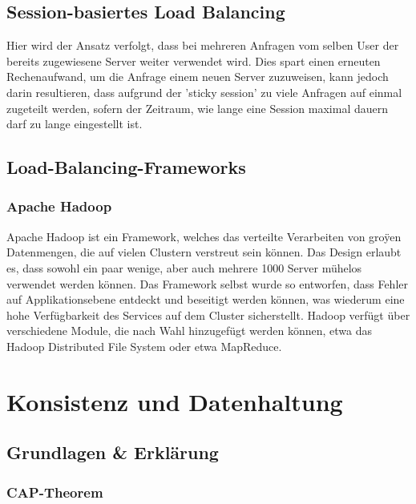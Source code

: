 \documentclass[letterpaper, 12pt]{article}
\let\tempsection\section
\renewcommand\section[1]{\vspace{-0.3cm}\tempsection{#1}\vspace{-0.3cm}}
\let\tempsubsection\subsection
\renewcommand\subsection[1]{\vspace{0cm}\tempsubsection{#1}\vspace{0cm}}
\let\tempsubsubsection\subsubsection
\renewcommand\subsubsection[1]{\vspace{0cm}\tempsubsubsection{#1}\vspace{0cm}}
\begin{document}
\subsection{Session-basiertes Load Balancing}

Hier wird der Ansatz verfolgt, dass bei mehreren Anfragen vom selben User der bereits zugewiesene Server weiter verwendet wird. Dies spart einen erneuten Rechenaufwand, um die Anfrage einem neuen Server zuzuweisen, kann jedoch darin resultieren, dass aufgrund der 'sticky session' zu viele Anfragen auf einmal zugeteilt werden, sofern der Zeitraum, wie lange eine Session maximal dauern darf zu lange eingestellt ist. \cite{ausarbeitunglb}

\subsection{Load-Balancing-Frameworks}

\subsubsection{Apache Hadoop}

Apache Hadoop ist ein Framework, welches das verteilte Verarbeiten von groÿen Datenmengen,
die auf vielen Clustern verstreut sein können. Das Design erlaubt es, dass sowohl ein paar wenige,
aber auch mehrere 1000 Server mühelos verwendet werden können. Das Framework selbst wurde so
entworfen, dass Fehler auf Applikationsebene entdeckt und beseitigt werden können, was wiederum
eine hohe Verfügbarkeit des Services auf dem Cluster sicherstellt. Hadoop verfügt über verschiedene Module, die nach Wahl hinzugefügt werden können, etwa das Hadoop Distributed File System oder etwa MapReduce. \cite{ausarbeitunglb}

\clearpage

\section{Konsistenz und Datenhaltung}

\subsection{Grundlagen \& Erklärung}

\subsubsection{CAP-Theorem}
\end{document}
